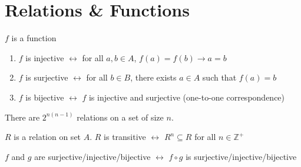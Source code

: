 \section{Relations \& Functions}
\begin{theorem}
	$f$ is a function 
	\begin{enumerate}
		\item $f$ is injective $\leftrightarrow$ for all $a,b\in A$, $f(a)=f(b) \rightarrow a=b$
		\item $f$ is surjective $\leftrightarrow$ for all $b\in B$, there exists $a\in A$ such that $f(a)=b$
		\item $f$ is bijective $\leftrightarrow$ $f$ is injective and surjective (one-to-one correspondence)
	\end{enumerate}
\end{theorem}

\begin{theorem}
	There are $2^{n(n-1)}$ relations on a set of size $n$.
\end{theorem}

\begin{theorem}
$R$ is a relation on set $A$. $R$ is transitive $\leftrightarrow$ $R^n \subseteq R$ for all $n\in \mathbb{Z}^+$
\end{theorem}

\begin{theorem}
	$f$ and $g$ are surjective/injective/bijective $\leftrightarrow$ $f\circ g$ is surjective/injective/bijective
\end{theorem}
